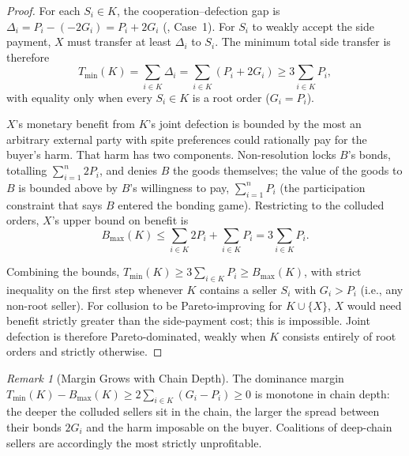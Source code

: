 \documentclass[11pt,a4paper]{article}
\theoremstyle{definition}
\theoremstyle{remark}
\newtheorem{remark}[theorem]{Remark}
\newcommand{\pay}{P}           %
\newcommand{\cumval}{G}        %
\begin{document}
\begin{proof}
For each $S_i \in K$, the cooperation--defection gap is
$\Delta_i = \pay_i - (-2\cumval_i) = \pay_i + 2\cumval_i$
(, Case~1). For $S_i$ to weakly accept
the side payment, $X$ must transfer at least $\Delta_i$ to $S_i$.
The minimum total side transfer is therefore
\begin{equation}
  T_{\min}(K) = \sum_{i \in K} \Delta_i
    = \sum_{i \in K} (\pay_i + 2\cumval_i)
    \geq 3 \sum_{i \in K} \pay_i,
\end{equation}
with equality only when every $S_i \in K$ is a root order
($\cumval_i = \pay_i$).

$X$'s monetary benefit from $K$'s joint defection is bounded by
the most an arbitrary external party with spite preferences could
rationally pay for the buyer's harm. That harm has two components.
Non-resolution locks $B$'s bonds, totalling $\sum_{i=1}^n 2\pay_i$,
and denies $B$ the goods themselves; the value of the goods to
$B$ is bounded above by $B$'s willingness to pay,
$\sum_{i=1}^n \pay_i$ (the participation constraint that says
$B$ entered the bonding game). Restricting to the colluded
orders, $X$'s upper bound on benefit is
\begin{equation}
  B_{\max}(K) \leq \sum_{i \in K} 2\pay_i
    + \sum_{i \in K} \pay_i
    = 3 \sum_{i \in K} \pay_i.
\end{equation}

Combining the bounds,
$T_{\min}(K) \geq 3\sum_{i \in K} \pay_i \geq B_{\max}(K)$,
with strict inequality on the first step whenever $K$ contains
a seller $S_i$ with $\cumval_i > \pay_i$ (i.e., any non-root
seller). For collusion to be Pareto-improving for $K \cup \{X\}$,
$X$ would need benefit strictly greater than the side-payment
cost; this is impossible. Joint defection is therefore
Pareto-dominated, weakly when $K$ consists entirely of root
orders and strictly otherwise.
\end{proof}

\begin{remark}[Margin Grows with Chain Depth]
\label{rem:collusion-depth}
The dominance margin $T_{\min}(K) - B_{\max}(K) \geq
2 \sum_{i \in K} (\cumval_i - \pay_i) \geq 0$ is monotone in
chain depth: the deeper the colluded sellers sit in the chain,
the larger the spread between their bonds $2\cumval_i$ and the
harm imposable on the buyer. Coalitions of deep-chain sellers
are accordingly the most strictly unprofitable.
\end{remark}
\end{document}
